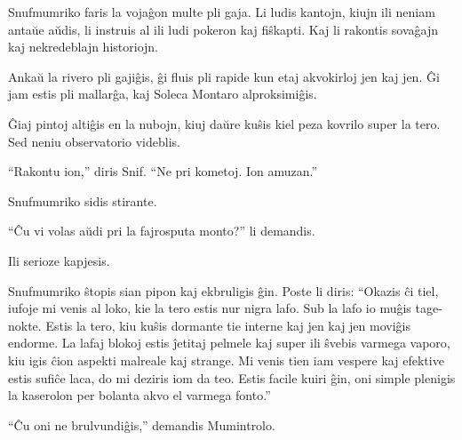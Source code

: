 Snufmumriko faris la vojaĝon multe pli gaja. Li ludis kantojn, kiujn ili neniam antaŭe aŭdis, li instruis al ili ludi pokeron kaj fiŝkapti. Kaj li rakontis sovaĝajn kaj nekredeblajn historiojn.

Ankaŭ la rivero pli gajiĝis, ĝi fluis pli rapide kun etaj akvokirloj jen kaj jen. Ĝi jam estis pli mallarĝa, kaj Soleca Montaro alproksimiĝis.

Ĝiaj pintoj altiĝis en la nubojn, kiuj daŭre kuŝis kiel peza kovrilo super la tero. Sed neniu observatorio videblis.

``Rakontu ion,'' diris Snif. ``Ne pri kometoj. Ion amuzan.''

Snufmumriko sidis stirante.

``Ĉu vi volas aŭdi pri la fajrosputa monto?'' li demandis.

Ili serioze kapjesis.

Snufmumriko ŝtopis sian pipon kaj ekbruligis ĝin. Poste li diris: ``Okazis ĉi tiel, iufoje mi venis al loko, kie la tero estis nur nigra lafo. Sub la lafo io muĝis tage-nokte. Estis la tero, kiu kuŝis dormante tie interne kaj jen kaj jen moviĝis endorme. La lafaj blokoj estis ĵetitaj pelmele kaj super ili ŝvebis varmega vaporo, kiu igis ĉion aspekti malreale kaj strange. Mi venis tien iam vespere kaj efektive estis sufiĉe laca, do mi deziris iom da teo. Estis facile kuiri ĝin, oni simple plenigis la kaserolon per bolanta akvo el varmega fonto.''

``Ĉu oni ne brulvundiĝis,'' demandis Mumintrolo.

